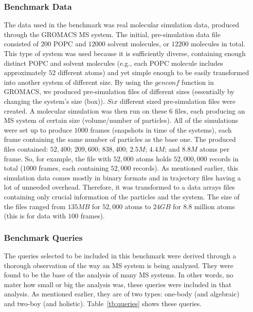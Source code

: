\documentclass[10pt,journal,final,letterpaper,twocolumn]{IEEEtran}
\begin{document}
\subsubsection{Benchmark Data}
The data used in the benchmark was real molecular simulation data,
produced through the GROMACS MS system. The initial, pre-simulation
data file consisted of $200$ POPC and $12000$ solvent molecules, or
$12200$ molecules in total. This type of system was used because it
is sufficiently diverse, containing enough distinct POPC and solvent
molecules (e.g., each POPC molecule includes approximately $52$
different atoms) and yet simple enough to be easily transformed into
another system of different size. By using the $genconf$ function in
GROMACS, we produced pre-simulation files of different sizes
(essentially by changing the system's size (box)). $Six$ different
sized pre-simulation files were created. A molecular simulation was
then run on these $6$ files, each producing an MS system of certain
size (volume/number of particles). All of the simulations were set
up to produce $1000$ frames (snapshots in time of the systems), each
frame containing the same number of particles as the base one. The
produced files contained: $52,400$; $209,600$; $838,400$; $2.5M$;
$4.4M$; and $8.8M$ atoms per frame. So, for example, the file with
$52,000$ atoms holds $52,000,000$ records in total ($1000$ frames,
each containing $52,000$ records). As mentioned earlier, this
simulation data comes mostly in binary formats and in trajectory
files having a lot of unneeded overhead. Therefore, it was
transformed to a data arrays files containing only crucial
information of the particles and the system. The size of the files
ranged from $135MB$ for $52,000$ atoms to $24GB$ for $8.8$ million
atoms (this is for data with $100$ frames).


\subsubsection{Benchmark Queries}
The queries selected to be included in this benchmark were derived
through a thorough observation of the way an MS system is being
analyzed. They were found to be the base of the analysis of many MS
systems. In other words, no mater how small or big the analysis was,
these queries were included in that analysis. As mentioned earlier,
they are of two types: one-body (and algebraic) and two-boy (and
holistic). Table~\ref{tb:queries} shows these queries.
\end{document}

